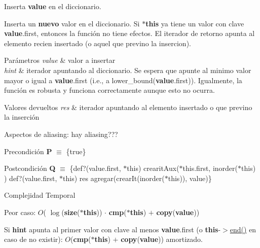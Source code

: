 Inserta {\bfseries value} en el diccionario. 

Inserta un {\bfseries nuevo} valor en el diccionario. Si {\bfseries $\ast$this} ya tiene un valor con clave {\bfseries value}.first, entonces la función no tiene efectos. El iterador de retorno apunta al elemento recien insertado (o aquel que previno la insercion).


\begin{DoxyParams}{Parámetros}
{\em value} & valor a insertar \\
\hline
{\em hint} & iterador apuntando al diccionario. Se espera que apunte al minimo valor mayor o igual a {\bfseries value}.first (i.\+e., a lower\+\_\+bound({\bfseries value}.first)). Igualmente, la función es robusta y funciona correctamente aunque esto no ocurra. \\
\hline
\end{DoxyParams}

\begin{DoxyRetVals}{Valores devueltos}
{\em res} & iterador apuntando al elemento insertado o que previno la inserción\\
\hline
\end{DoxyRetVals}
\begin{DoxyParagraph}{Aspectos de aliasing\+:}
hay aliasing???
\end{DoxyParagraph}
\begin{DoxyPrecond}{Precondición}
{\bfseries P} $\equiv$ \{true\} 
\end{DoxyPrecond}
\begin{DoxyPostcond}{Postcondición}
{\bfseries Q} $\equiv$ \{def?(value.\+first, $\ast$this)  crearit\+Aux($\ast$this.first, inorder($\ast$this) )   def?(value.\+first, $\ast$this)  res  agregar(crear\+It(inorder($\ast$this)), value)\}
\end{DoxyPostcond}

\begin{DoxyDescription}
\item[Complejidad Temporal]
\begin{DoxyItemize}
\item Peor caso\+: $O$( $\log$({\bfseries size}({\bfseries $\ast$this})) $\cdot$ {\bfseries cmp}({\bfseries $\ast$this}) $+$ {\bfseries copy}({\bfseries value}))
\item Si {\bfseries hint} apunta al primer valor con clave al menos {\bfseries value}.first (o {\bfseries this}-\/$>$\hyperlink{classaed2_1_1iterator_a67caf9468be999e9be96b7add5d79946_a67caf9468be999e9be96b7add5d79946}{end()} en caso de no existir)\+: $O$({\bfseries cmp}({\bfseries $\ast$this}) $+$ {\bfseries copy}({\bfseries value})) amortizado. 
\end{DoxyItemize}
\end{DoxyDescription}


